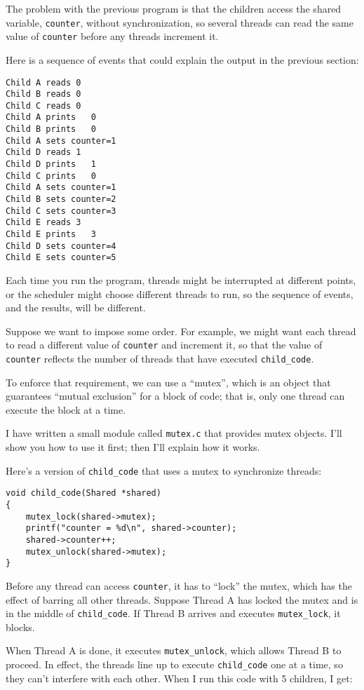 \documentclass[12pt]{book}
\begin{document}
The problem with the previous program is that the children
access the shared variable, {\tt counter}, without synchronization,
so several threads can read the same value of {\tt counter} before
any threads increment it.

Here is a sequence of events that could explain the output in the
previous section:

\begin{verbatim}
Child A reads 0
Child B reads 0
Child C reads 0
Child A prints   0
Child B prints   0
Child A sets counter=1
Child D reads 1
Child D prints   1
Child C prints   0
Child A sets counter=1
Child B sets counter=2
Child C sets counter=3
Child E reads 3
Child E prints   3
Child D sets counter=4
Child E sets counter=5
\end{verbatim}

Each time you run the program, threads might be interrupted at different
points, or the scheduler might choose different threads to run, so
the sequence of events, and the results, will be different.

Suppose we want to impose some order.  For example, we might want
each thread to read a different value of {\tt counter} and increment
it, so that the value of {\tt counter} reflects the number of
threads that have executed \verb"child_code".

To enforce that requirement, we can use a ``mutex'', which is
an object that guarantees ``mutual exclusion'' for a block of code;
that is, only one thread can execute the block at a time.

I have written a small module called {\tt mutex.c} that provides
mutex objects.  I'll show you how to use it first; then I'll explain
how it works.

Here's a version of \verb"child_code" that uses a mutex to synchronize
threads:

\begin{verbatim}
void child_code(Shared *shared)
{
    mutex_lock(shared->mutex);
    printf("counter = %d\n", shared->counter);
    shared->counter++;
    mutex_unlock(shared->mutex);
}
\end{verbatim}

Before any thread can access {\tt counter}, it has to ``lock''
the mutex, which has the effect of barring all other threads.
Suppose Thread A has locked the mutex and is in the
middle of \verb"child_code".  If Thread B arrives and
executes \verb"mutex_lock", it blocks.

When Thread A is done, it executes \verb"mutex_unlock",
which allows Thread B to proceed.  In effect, the threads
line up to execute \verb"child_code" one at a time, so they
can't interfere with each other.  When I run this code with
5 children, I get:
\end{document}

